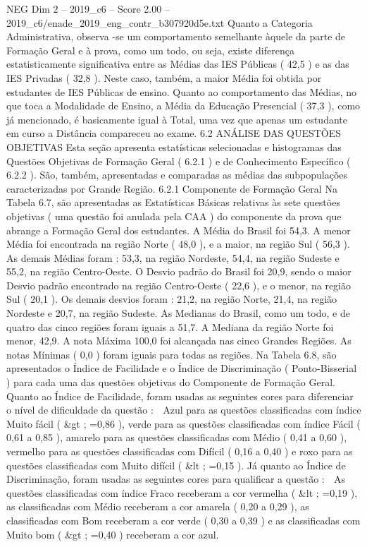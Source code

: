 \begin{textsample}{NEG Dim 2 – 2019\_c6 – Score 2.00 – 2019\_c6/enade\_2019\_eng\_contr\_b307920d5e.txt}
Quanto a Categoria Administrativa, observa -se um comportamento semelhante àquele da parte de Formação Geral e à prova, como um todo, ou seja, existe diferença estatisticamente significativa entre as Médias das IES Públicas ( 42,5 ) e as das IES Privadas ( 32,8 ).
Neste caso, também, a maior Média foi obtida por estudantes de IES Públicas de ensino.
Quanto ao comportamento das Médias, no que toca a Modalidade de Ensino, a Média da Educação Presencial ( 37,3 ), como já mencionado, é basicamente igual à Total, uma vez que apenas um estudante em curso a Distância compareceu ao exame. 6.2 ANÁLISE DAS QUESTÕES OBJETIVAS Esta seção apresenta estatísticas selecionadas e histogramas das Questões Objetivas de Formação Geral ( 6.2.1 ) e de Conhecimento Específico ( 6.2.2 ).
São, também, apresentadas e comparadas as médias das subpopulações caracterizadas por Grande Região. 6.2.1 Componente de Formação Geral Na Tabela 6.7, são apresentadas as Estatísticas Básicas relativas às sete questões objetivas ( uma questão foi anulada pela CAA ) do componente da prova que abrange a Formação Geral dos estudantes.
A Média do Brasil foi 54,3.
A menor Média foi encontrada na região Norte ( 48,0 ), e a maior, na região Sul ( 56,3 ).
As demais Médias foram : 53,3, na região Nordeste, 54,4, na região Sudeste e 55,2, na região Centro-Oeste.
O Desvio padrão do Brasil foi 20,9, sendo o maior Desvio padrão encontrado na região Centro-Oeste ( 22,6 ), e o menor, na região Sul ( 20,1 ).
Os demais desvios foram : 21,2, na região Norte, 21,4, na região Nordeste e 20,7, na região Sudeste.
As Medianas do Brasil, como um todo, e de quatro das cinco regiões foram iguais a 51,7.
A Mediana da região Norte foi menor, 42,9.
A nota Máxima 100,0 foi alcançada nas cinco Grandes Regiões.
As notas Mínimas ( 0,0 ) foram iguais para todas as regiões.
Na Tabela 6.8, são apresentados o Índice de Facilidade e o Índice de Discriminação ( Ponto-Bisserial ) para cada uma das questões objetivas do Componente de Formação Geral.
Quanto ao Índice de Facilidade, foram usadas as seguintes cores para diferenciar o nível de dificuldade da questão :  Azul para as questões classificadas com índice Muito fácil ( \&gt ; =0,86 ), verde para as questões classificadas com índice Fácil ( 0,61 a 0,85 ), amarelo para as questões classificadas com Médio ( 0,41 a 0,60 ), vermelho para as questões classificadas com Difícil ( 0,16 a 0,40 ) e roxo para as questões classificadas com Muito difícil ( \&lt ; =0,15 ).
Já quanto ao Índice de Discriminação, foram usadas as seguintes cores para qualificar a questão :  As questões classificadas com índice Fraco receberam a cor vermelha ( \&lt ; =0,19 ), as classificadas com Médio receberam a cor amarela ( 0,20 a 0,29 ), as classificadas com Bom receberam a cor verde ( 0,30 a 0,39 ) e as classificadas com Muito bom ( \&gt ; =0,40 ) receberam a cor azul.

\end{textsample}
